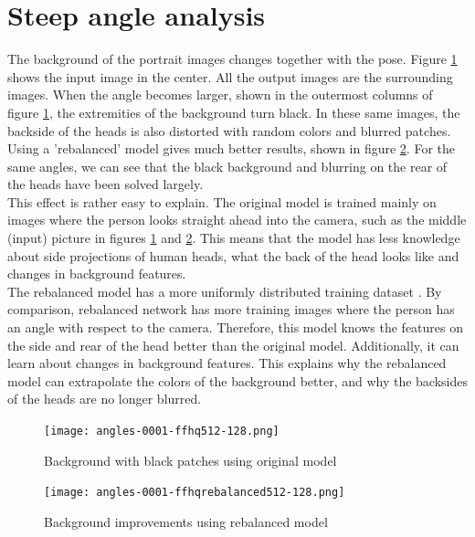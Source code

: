 \section{Steep angle analysis}
The background of the portrait images changes together with the pose. Figure \ref{fig:non_rebalanced} shows the input image in the center. All the output images are the surrounding images. When the angle becomes larger, shown in the outermost columns of figure \ref{fig:non_rebalanced}, the extremities of the background turn black. In these same images, the backside of the heads is also distorted with random colors and blurred patches. 
Using a 'rebalanced' model gives much better results, shown in figure \ref{fig:rebalanced}. For the same angles, we can see that the black background and blurring on the rear of the heads have been solved largely. \\
This effect is rather easy to explain. The original model is trained mainly on images where the person looks straight ahead into the camera, such as the middle (input) picture in figures \ref{fig:non_rebalanced} and \ref{fig:rebalanced}. This means that the model has less knowledge about side projections of human heads, what the back of the head looks like and changes in background features. \\
The rebalanced model has a more uniformly distributed training dataset \cite{github}. By comparison,  rebalanced network has more training images where the person has an angle with respect to the camera. Therefore, this model knows the features on the side and rear of the head better than the original model. Additionally, it can learn about changes in background features. This explains why the rebalanced model can extrapolate the colors of the background better, and why the backsides of the heads are no longer blurred.
\begin{figure}[H]
\centering
  \centering
  \texttt{[image: angles-0001-ffhq512-128.png]}
  \caption{Background with black patches using original model}
  \label{fig:non_rebalanced}
\end{figure}
\begin{figure}[H]
  \centering 
  \texttt{[image: angles-0001-ffhqrebalanced512-128.png]}
  \caption{Background improvements using rebalanced model}
  \label{fig:rebalanced}
\end{figure}
